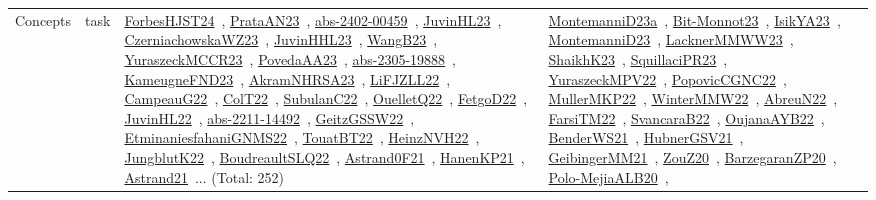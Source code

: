 {\begin{longtable}{lp{3cm}>{\raggedright\arraybackslash}p{6cm}>{\raggedright\arraybackslash}p{6cm}>{\raggedright\arraybackslash}p{8cm}}
Concepts & task & \href{works/ForbesHJST24.pdf}{ForbesHJST24}~\cite{ForbesHJST24}, \href{works/PrataAN23.pdf}{PrataAN23}~\cite{PrataAN23}, \href{works/abs-2402-00459.pdf}{abs-2402-00459}~\cite{abs-2402-00459}, \href{works/JuvinHL23.pdf}{JuvinHL23}~\cite{JuvinHL23}, \href{works/CzerniachowskaWZ23.pdf}{CzerniachowskaWZ23}~\cite{CzerniachowskaWZ23}, \href{works/JuvinHHL23.pdf}{JuvinHHL23}~\cite{JuvinHHL23}, \href{works/WangB23.pdf}{WangB23}~\cite{WangB23}, \href{works/YuraszeckMCCR23.pdf}{YuraszeckMCCR23}~\cite{YuraszeckMCCR23}, \href{works/PovedaAA23.pdf}{PovedaAA23}~\cite{PovedaAA23}, \href{works/abs-2305-19888.pdf}{abs-2305-19888}~\cite{abs-2305-19888}, \href{works/KameugneFND23.pdf}{KameugneFND23}~\cite{KameugneFND23}, \href{works/AkramNHRSA23.pdf}{AkramNHRSA23}~\cite{AkramNHRSA23}, \href{works/LiFJZLL22.pdf}{LiFJZLL22}~\cite{LiFJZLL22}, \href{works/CampeauG22.pdf}{CampeauG22}~\cite{CampeauG22}, \href{works/ColT22.pdf}{ColT22}~\cite{ColT22}, \href{works/SubulanC22.pdf}{SubulanC22}~\cite{SubulanC22}, \href{works/OuelletQ22.pdf}{OuelletQ22}~\cite{OuelletQ22}, \href{works/FetgoD22.pdf}{FetgoD22}~\cite{FetgoD22}, \href{works/JuvinHL22.pdf}{JuvinHL22}~\cite{JuvinHL22}, \href{works/abs-2211-14492.pdf}{abs-2211-14492}~\cite{abs-2211-14492}, \href{works/GeitzGSSW22.pdf}{GeitzGSSW22}~\cite{GeitzGSSW22}, \href{works/EtminaniesfahaniGNMS22.pdf}{EtminaniesfahaniGNMS22}~\cite{EtminaniesfahaniGNMS22}, \href{works/TouatBT22.pdf}{TouatBT22}~\cite{TouatBT22}, \href{works/HeinzNVH22.pdf}{HeinzNVH22}~\cite{HeinzNVH22}, \href{works/JungblutK22.pdf}{JungblutK22}~\cite{JungblutK22}, \href{works/BoudreaultSLQ22.pdf}{BoudreaultSLQ22}~\cite{BoudreaultSLQ22}, \href{works/Astrand0F21.pdf}{Astrand0F21}~\cite{Astrand0F21}, \href{works/HanenKP21.pdf}{HanenKP21}~\cite{HanenKP21}, \href{works/Astrand21.pdf}{Astrand21}~\cite{Astrand21}... (Total: 252) & \href{works/MontemanniD23a.pdf}{MontemanniD23a}~\cite{MontemanniD23a}, \href{works/Bit-Monnot23.pdf}{Bit-Monnot23}~\cite{Bit-Monnot23}, \href{works/IsikYA23.pdf}{IsikYA23}~\cite{IsikYA23}, \href{works/MontemanniD23.pdf}{MontemanniD23}~\cite{MontemanniD23}, \href{works/LacknerMMWW23.pdf}{LacknerMMWW23}~\cite{LacknerMMWW23}, \href{works/ShaikhK23.pdf}{ShaikhK23}~\cite{ShaikhK23}, \href{works/SquillaciPR23.pdf}{SquillaciPR23}~\cite{SquillaciPR23}, \href{works/YuraszeckMPV22.pdf}{YuraszeckMPV22}~\cite{YuraszeckMPV22}, \href{works/PopovicCGNC22.pdf}{PopovicCGNC22}~\cite{PopovicCGNC22}, \href{works/MullerMKP22.pdf}{MullerMKP22}~\cite{MullerMKP22}, \href{works/WinterMMW22.pdf}{WinterMMW22}~\cite{WinterMMW22}, \href{works/AbreuN22.pdf}{AbreuN22}~\cite{AbreuN22}, \href{works/FarsiTM22.pdf}{FarsiTM22}~\cite{FarsiTM22}, \href{works/SvancaraB22.pdf}{SvancaraB22}~\cite{SvancaraB22}, \href{works/OujanaAYB22.pdf}{OujanaAYB22}~\cite{OujanaAYB22}, \href{works/BenderWS21.pdf}{BenderWS21}~\cite{BenderWS21}, \href{works/HubnerGSV21.pdf}{HubnerGSV21}~\cite{HubnerGSV21}, \href{works/GeibingerMM21.pdf}{GeibingerMM21}~\cite{GeibingerMM21}, \href{works/ZouZ20.pdf}{ZouZ20}~\cite{ZouZ20}, \href{works/BarzegaranZP20.pdf}{BarzegaranZP20}~\cite{BarzegaranZP20}, \href{works/Polo-MejiaALB20.pdf}{Polo-MejiaALB20}~\cite{Polo-MejiaALB20}, 
\end{longtable}}
